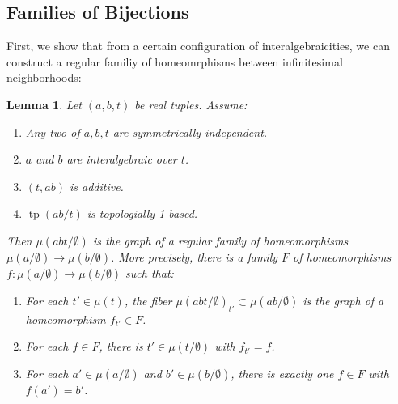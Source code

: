 \documentclass{amsart}
\newtheorem{lemma}[theorem]{Lemma}
\theoremstyle{definition}
\newcommand{\tp}{\operatorname{tp}}
\begin{document}
\subsection{Families of Bijections}

First, we show that from a certain configuration of interalgebraicities, we can construct a regular familiy of homeomrphisms between infinitesimal neighborhoods: 

\begin{lemma}\label{L: family of bijections} Let $(a,b,t)$ be real tuples. Assume:
\begin{enumerate}
\item Any two of $a,b,t$ are symmetrically independent.
\item $a$ and $b$ are interalgebraic over $t$.
\item $(t,ab)$ is additive. 
\item $\tp(ab/t)$ is topologially 1-based.
\end{enumerate}
Then $\mu(abt/\emptyset)$ is the graph of a regular family of homeomorphisms $\mu(a/\emptyset)\rightarrow\mu(b/\emptyset)$. More precisely, there is a family $F$ of homeomorphisms $f:\mu(a/\emptyset)\rightarrow\mu(b/\emptyset)$ such that:
\begin{enumerate}
    \item[(i)] For each $t'\in\mu(t)$, the fiber $\mu(abt/\emptyset)_{t'}\subset\mu(ab/\emptyset)$ is the graph of a homeomorphism $f_{t'}\in F$.
    \item[(ii)] For each $f\in F$, there is $t'\in\mu(t/\emptyset)$ with $f_{t'}=f$.
    \item[(iii)] For each $a'\in\mu(a/\emptyset)$ and $b'\in\mu(b/\emptyset)$, there is exactly one $f\in F$ with $f(a')=b'$.
\end{enumerate}
\end{lemma}
\end{document}
